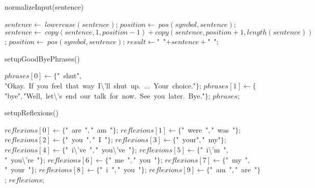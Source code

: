 \documentclass[a4paper,10pt]{article}
\begin{document}
\begin{algorithm}
\caption{normalizeInput(sentence)}
\begin{algorithmic}[5]

\STATE {}
\STATE {}
\STATE {}
  \STATE \(sentence\gets\ lowercase(sentence)\);
    \STATE \(position\gets\ pos(symbol,sentence)\);
      \STATE \(sentence\gets\ copy(sentence,1,position-1)+copy(sentence,position+1,length(sentence))\);
      \STATE \(position\gets\ pos(symbol,sentence)\);
    \ENDWHILE
  \ENDFOR
  \STATE \(result\gets\)"{}\ "{}\(+sentence+\)"{}\ "{}\(\);

\end{algorithmic}
\end{algorithm}


\begin{algorithm}
\caption{setupGoodByePhrases()}
\begin{algorithmic}[5]

  \STATE \(phrases[0]\gets\{\)"{}\ shut"{}\(,\)"{}Okay.\ If\ you\ feel\ that\ way\ I\textbackslash{}'{}ll\ shut\ up.\ ...\ Your\ choice."{}\(\}\);
  \STATE \(phrases[1]\gets\{\)"{}bye"{}\(,\)"{}Well,\ let\textbackslash{}'{}s\ end\ our\ talk\ for\ now.\ See\ you\ later.\ Bye."{}\(\}\);
  \RETURN\(phrases\);

\end{algorithmic}
\end{algorithm}


\begin{algorithm}
\caption{setupReflexions()}
\begin{algorithmic}[5]

\STATE {}
  \STATE \(reflexions[0]\gets\{\)"{}\ are\ "{}\(,\)"{}\ am\ "{}\(\}\);
  \STATE \(reflexions[1]\gets\{\)"{}\ were\ "{}\(,\)"{}\ was\ "{}\(\}\);
  \STATE \(reflexions[2]\gets\{\)"{}\ you\ "{}\(,\)"{}\ I\ "{}\(\}\);
  \STATE \(reflexions[3]\gets\{\)"{}\ your"{}\(,\)"{}\ my"{}\(\}\);
  \STATE \(reflexions[4]\gets\{\)"{}\ i\textbackslash{}'{}ve\ "{}\(,\)"{}\ you\textbackslash{}'{}ve\ "{}\(\}\);
  \STATE \(reflexions[5]\gets\{\)"{}\ i\textbackslash{}'{}m\ "{}\(,\)"{}\ you\textbackslash{}'{}re\ "{}\(\}\);
  \STATE \(reflexions[6]\gets\{\)"{}\ me\ "{}\(,\)"{}\ you\ "{}\(\}\);
  \STATE \(reflexions[7]\gets\{\)"{}\ my\ "{}\(,\)"{}\ your\ "{}\(\}\);
  \STATE \(reflexions[8]\gets\{\)"{}\ i\ "{}\(,\)"{}\ you\ "{}\(\}\);
  \STATE \(reflexions[9]\gets\{\)"{}\ am\ "{}\(,\)"{}\ are\ "{}\(\}\);
  \RETURN\(reflexions\);

\end{algorithmic}
\end{algorithm}
\end{document}

